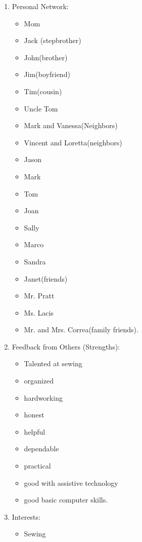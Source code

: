 \begin{enumerate}[leftmargin=*]
\item Personal Network: 
\begin{multicols}{2}\begin{itemize}
\item Mom
\item Jack \break (stepbrother)
\item John\break  (brother)
\item Jim\break  (boyfriend)
\item Tim\break  (cousin)
\item Uncle Tom
\item Mark and Vanessa\break  (Neighbors)
\item Vincent and Loretta\break  (neighbors)
\item Jason
\item Mark
\item Tom
\item Joan
\item Sally
\item Marco
\item Sandra
\item Janet\break  (friends)
\item Mr. Pratt
\item Ms. Lacis
\item Mr. and Mrs. Correa\break  (family friends).
\end{itemize}\end{multicols}
\item Feedback from Others (Strengths): 
\begin{multicols}{2}\begin{itemize}
\item Talented at sewing
\item organized
\item hardworking
\item honest
\item helpful
\item dependable
\item practical
\item good with assistive technology
\item good basic computer skills.
\end{itemize}\end{multicols}
\pagebreak \item Interests: 
\begin{multicols}{2}\begin{itemize}
\item Sewing

\end{itemize}
\end{multicols}
\end{enumerate}
